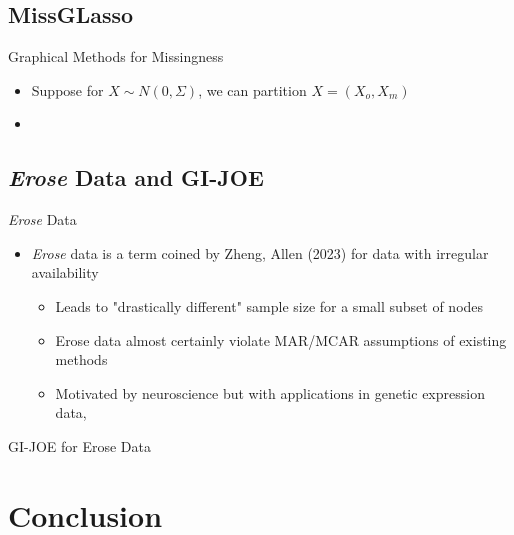 \documentclass{beamer}
\begin{document}
\subsection{MissGLasso}

\begin{frame}{Graphical Methods for Missingness}
    \begin{itemize}
        \item Suppose for $X \sim N(0, \Sigma)$, we can partition $X = (X_o, X_m)$
        \item 
    \end{itemize}
\end{frame}

\subsection{{\it Erose} Data and GI-JOE}



\begin{frame}{{\it Erose} Data}
    \begin{itemize}
        \item {\it Erose} data is a term coined by Zheng, Allen (2023) for data with irregular availability \cite{zheng_gi-joe_2023}
        \begin{itemize}
            \item Leads to "drastically different" sample size for a small subset of nodes 
            \item Erose data almost certainly violate MAR/MCAR assumptions of existing methods 
            \item Motivated by neuroscience but with applications in genetic expression data, 
        \end{itemize}
    \end{itemize} 
\end{frame}


\begin{frame}{GI-JOE for Erose Data}
\end{frame}


\section*{Conclusion}
\end{document}
